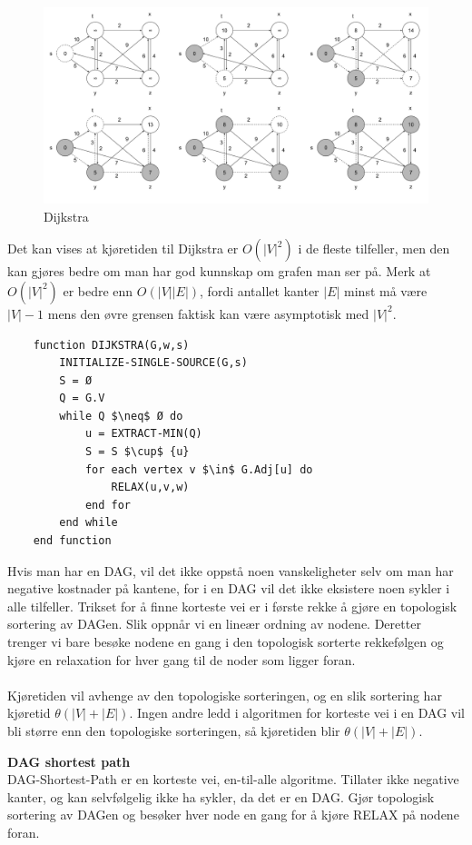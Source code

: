 \begin{figure}[H]
\includegraphics[scale=0.3]{images/dijstra}
\centering %
\caption{Dijkstra}
\label{fig:dijkstra}
\end{figure}

\noindent Det kan vises at kjøretiden til Dijkstra er $O(|V|^2)$ i de fleste tilfeller, men den kan gjøres bedre om man har god kunnskap om grafen man ser på. Merk at $O(|V|^2)$ er bedre enn $O(|V||E|)$, fordi antallet kanter $|E|$ minst må være $|V| - 1$ mens den øvre grensen faktisk kan være asymptotisk med $|V|^2$.

\begin{lstlisting}
    function DIJKSTRA(G,w,s)
	    INITIALIZE-SINGLE-SOURCE(G,s)
    	S = Ø
    	Q = G.V
    	while Q $\neq$ Ø do
    		u = EXTRACT-MIN(Q)
    		S = S $\cup$ {u}
    		for each vertex v $\in$ G.Adj[u] do
    			RELAX(u,v,w)
    		end for
    	end while
    end function
\end{lstlisting}

\noindent Hvis man har en DAG, vil det ikke oppstå noen vanskeligheter selv om man har negative kostnader på kantene, for i en DAG vil det ikke eksistere noen sykler i alle tilfeller. Trikset for å finne korteste vei er i første rekke å gjøre en topologisk sortering av DAGen. Slik oppnår vi en lineær ordning av nodene. Deretter trenger vi bare besøke nodene en gang i den topologisk sorterte rekkefølgen og kjøre en relaxation for hver gang til de noder som ligger foran. 
\\\\
Kjøretiden vil avhenge av den topologiske sorteringen, og en slik sortering har kjøretid $\theta(|V|+|E|)$. Ingen andre ledd i algoritmen for korteste vei i en DAG vil bli større enn den topologiske sorteringen, så kjøretiden blir $\theta(|V|+|E|)$.

\noindent\textbf{DAG shortest path}\\
DAG-Shortest-Path er en korteste vei, en-til-alle algoritme. Tillater ikke negative kanter, og kan selvfølgelig ikke ha sykler, da det er en DAG. Gjør topologisk sortering av DAGen og besøker hver node en gang for å kjøre RELAX på nodene foran.

